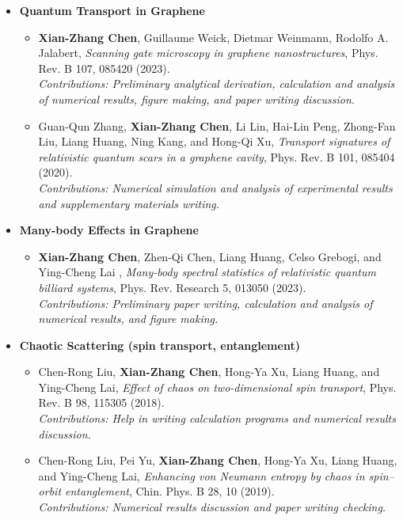 \documentclass[letterpaper,10.8pt]{article}
\begin{document}
  \begin{itemize}[font=$\bullet$]
  \item[]{\textbf{Quantum Transport in Graphene}
    \begin{itemize}
        \item {\textbf{Xian-Zhang Chen}, Guillaume Weick, Dietmar Weinmann, Rodolfo A. Jalabert, \textit{Scanning gate microscopy in graphene nanostructures}, Phys. Rev. B 107, 085420 (2023).\\
        \textit{Contributions: Preliminary analytical derivation, calculation and analysis of numerical results, figure making, and paper writing discussion.}
        }
        \item {Guan-Qun Zhang, \textbf{Xian-Zhang Chen}, Li Lin, Hai-Lin Peng, Zhong-Fan Liu, Liang Huang, Ning Kang, and Hong-Qi Xu, \textit{Transport signatures of relativistic quantum scars in a graphene cavity}, Phys. Rev. B 101, 085404 (2020).\\
        \textit{Contributions: Numerical simulation and analysis of experimental results and supplementary materials writing.}
        }
    \end{itemize}}

    \item[]{\textbf{Many-body Effects in Graphene}
    \begin{itemize}
        \item {\textbf{Xian-Zhang Chen}, Zhen-Qi Chen, Liang Huang, Celso Grebogi, and Ying-Cheng Lai
, \textit{Many-body spectral statistics of relativistic quantum billiard systems}, Phys. Rev. Research 5, 013050 (2023).\\
        \textit{Contributions: Preliminary paper writing, calculation and analysis of numerical results, and figure making. }
        }
    \end{itemize}}

    \item[]{\textbf{Chaotic Scattering (spin transport, entanglement)}
    \begin{itemize}
        \item {Chen-Rong Liu, \textbf{Xian-Zhang Chen}, Hong-Ya Xu, Liang Huang, and Ying-Cheng Lai, \textit{Effect of chaos on two-dimensional spin transport},  Phys. Rev. B 98, 115305 (2018).\\
        \textit{Contributions: Help in writing calculation programs and numerical results discussion.}
        }
        \item {Chen-Rong Liu, Pei Yu, \textbf{Xian-Zhang Chen}, Hong-Ya Xu, Liang Huang, and Ying-Cheng Lai, \textit{Enhancing von Neumann entropy by chaos in spin–orbit entanglement}, Chin. Phys. B 28, 10 (2019).\\
        \textit{Contributions: Numerical results discussion and paper writing checking.}
        }
    \end{itemize}}
    

\end{itemize}
\end{document}
